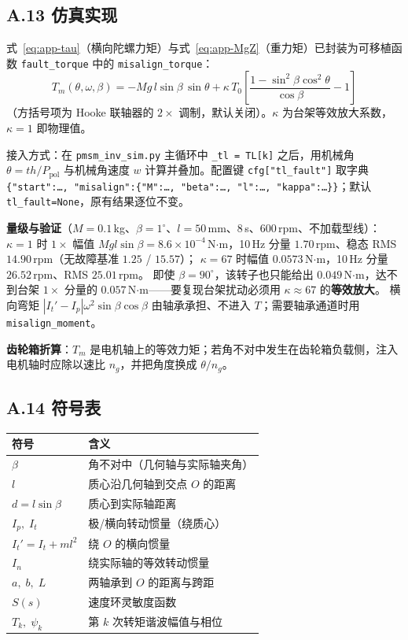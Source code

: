 \subsection*{A.13 仿真实现}

式~\eqref{eq:app-tau}（横向陀螺力矩）与式~\eqref{eq:app-MgZ}（重力矩）已封装为可移植函数 \texttt{fault\_torque} 中的 \texttt{misalign\_torque}：
\begin{equation}
T_m(\theta,\omega,\beta)
=-M g\,l\sin\beta\,\sin\theta
+\kappa\,T_0\left[\frac{1-\sin^2\beta\cos^2\theta}{\cos\beta}-1\right]
\label{eq:app-impl-mis}
\end{equation}
（方括号项为 Hooke 联轴器的 $2\times$ 调制，默认关闭）。$\kappa$ 为台架等效放大系数，$\kappa=1$ 即物理值。

接入方式：在 \texttt{pmsm\_inv\_sim.py} 主循环中 \texttt{\_tl = TL[k]} 之后，用机械角 $\theta=th/P_{\mathrm{pol}}$ 与机械角速度 $w$ 计算并叠加。配置键 \texttt{cfg["tl\_fault"]} 取字典 \texttt{\{"start":\ldots,\ "misalign":\{"M":\ldots,\ "beta":\ldots,\ "l":\ldots,\ "kappa":\ldots\}\}}；默认 \texttt{tl\_fault=None}，原有结果逐位不变。

\textbf{量级与验证}（$M=0.1$\,kg、$\beta=1^\circ$、$l=50$\,mm、8\,s、600\,rpm、不加载型线）：
$\kappa=1$ 时 $1\times$ 幅值 $Mgl\sin\beta=8.6\times10^{-4}$\,N$\cdot$m，10\,Hz 分量 $1.70$\,rpm、稳态 RMS $14.90$\,rpm（无故障基准 $1.25$ / $15.57$）；
$\kappa=67$ 时幅值 $0.0573$\,N$\cdot$m，10\,Hz 分量 $26.52$\,rpm、RMS $25.01$\,rpm。
即使 $\beta=90^\circ$，该转子也只能给出 $0.049$\,N$\cdot$m，达不到台架 $1\times$ 分量的 $0.057$\,N$\cdot$m——要复现台架扰动必须用 $\kappa\approx67$ 的\textbf{等效放大}。
横向弯矩 $|I_t'-I_p|\omega^2\sin\beta\cos\beta$ 由轴承承担、不进入 $T$；需要轴承通道时用 \texttt{misalign\_moment}。



\textbf{齿轮箱折算}：$T_m$ 是电机轴上的等效力矩；若角不对中发生在齿轮箱负载侧，注入电机轴时应除以速比 $n_g$，并把角度换成 $\theta/n_g$。

\subsection*{A.14 符号表}

\begin{center}\footnotesize
\begin{tabular}{@{}ll@{}}
\toprule
符号 & 含义\\
\midrule
$\beta$ & 角不对中（几何轴与实际轴夹角）\\
$l$ & 质心沿几何轴到交点 $O$ 的距离\\
$d=l\sin\beta$ & 质心到实际轴距离\\
$I_p,\;I_t$ & 极/横向转动惯量（绕质心）\\
$I_t'=I_t+ml^2$ & 绕 $O$ 的横向惯量\\
$I_n$ & 绕实际轴的等效转动惯量\\
$a,\;b,\;L$ & 两轴承到 $O$ 的距离与跨距\\
$S(s)$ & 速度环灵敏度函数\\
$T_k,\;\psi_k$ & 第 $k$ 次转矩谐波幅值与相位\\
\bottomrule
\end{tabular}
\end{center}
